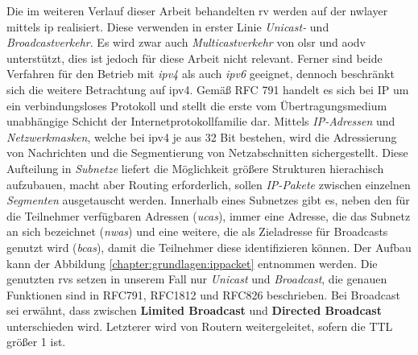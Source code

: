 Die im weiteren Verlauf dieser Arbeit behandelten \acrlong{rv} werden auf der \gls{nwlayer} mittels \gls{ip} realisiert. Diese verwenden in erster Linie \textit{Unicast-} und \textit{Broadcastverkehr}. Es wird zwar auch \textit{Multicastverkehr} von \gls{olsr} und \gls{aodv} unterstützt, dies ist jedoch für diese Arbeit nicht relevant. Ferner sind beide Verfahren für den Betrieb mit \textit{\gls{ipv4}} als auch \textit{\gls{ipv6}} \cite{AODV6}\cite{RFC3626} geeignet, dennoch beschränkt sich die weitere Betrachtung auf \gls{ipv4}. Gemäß RFC 791 \cite{RFC791} handelt es sich bei IP um ein verbindungsloses Protokoll und stellt die erste vom Übertragungsmedium unabhängige Schicht der Internetprotokollfamilie dar. Mittels \textit{IP-Adressen} und \textit{Netzwerkmasken}, welche bei \gls{ipv4} je aus 32 Bit bestehen, wird die Adressierung von Nachrichten und die Segmentierung von Netzabschnitten sichergestellt. Diese Aufteilung in \textit{Subnetze} liefert die Möglichkeit größere Strukturen hierachisch aufzubauen, macht aber Routing erforderlich, sollen \textit{IP-Pakete} zwischen einzelnen \textit{Segmenten} ausgetauscht werden. Innerhalb eines Subnetzes gibt es, neben den für die Teilnehmer verfügbaren Adressen (\textit{\glspl{uca}}), immer eine Adresse, die das Subnetz an sich bezeichnet (\textit{\glspl{nwa}}) und eine weitere, die als Zieladresse für Broadcasts genutzt wird (\textit{\glspl{bca}}), damit die Teilnehmer diese identifizieren können. Der Aufbau kann der Abbildung \ref{chapter:grundlagen:ippacket} entnommen werden. Die genutzten \glspl{rv} setzen in unserem Fall nur \textit{Unicast} und \textit{Broadcast}, die genauen Funktionen sind in RFC791, RFC1812 und RFC826 beschrieben. Bei Broadcast sei erwähnt, dass zwischen \textbf{Limited Broadcast} und \textbf{Directed Broadcast} unterschieden wird. Letzterer wird von Routern weitergeleitet, sofern die TTL größer 1 ist.



